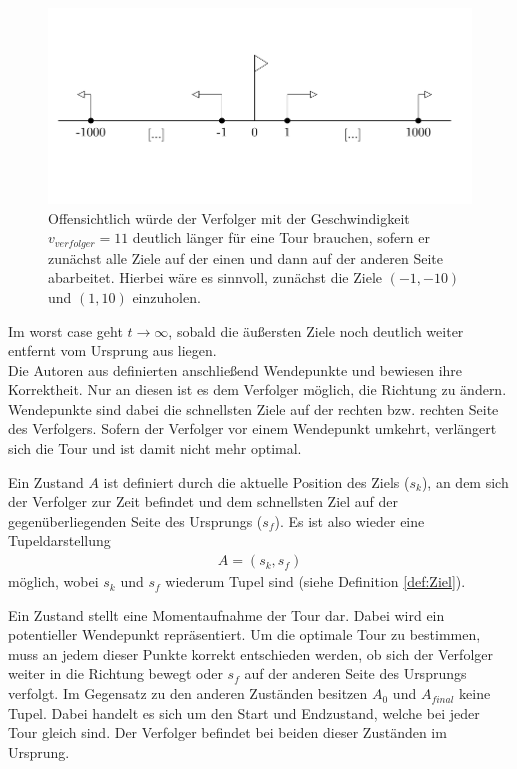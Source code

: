 \documentclass[german,version-2019-11]{uzl-thesis}
\begin{document}
\begin{figure}[htbp]
\centering
\includegraphics[scale=0.68]{../Grafiken/Verwendete/1DGegenbsp.PNG}
\caption{Offensichtlich würde der Verfolger mit der Geschwindigkeit $v_{verfolger}=11$ deutlich länger für eine Tour brauchen, sofern er zunächst alle Ziele auf der einen und dann auf der anderen Seite abarbeitet. Hierbei wäre es sinnvoll, zunächst die Ziele $(-1,-10)$ und $(1,10)$ einzuholen.}
\label{fig:GegenBsp1Dim}
\end{figure}
Im worst case geht $t\rightarrow\infty$, sobald die äußersten Ziele noch deutlich weiter entfernt vom Ursprung aus liegen. \\
Die Autoren aus \cite{helvig} definierten anschließend Wendepunkte und bewiesen ihre Korrektheit. Nur an diesen ist es dem Verfolger möglich, die Richtung zu ändern. Wendepunkte sind dabei die schnellsten Ziele auf der rechten bzw. rechten Seite des Verfolgers. Sofern der Verfolger vor einem Wendepunkt umkehrt, verlängert sich die Tour und ist damit nicht mehr optimal.
\begin{definition}
Ein Zustand $A$ ist definiert durch die aktuelle Position des Ziels ($s_k$), an dem sich der Verfolger zur Zeit befindet und dem schnellsten Ziel auf der gegenüberliegenden Seite des Ursprungs ($s_f$). Es ist also wieder eine Tupeldarstellung
\begin{align*}
A = (s_k, s_f)
\end{align*}
möglich, wobei $s_k$ und $s_f$ wiederum Tupel sind (siehe Definition \ref{def:Ziel}).
\end{definition}\noindent
Ein Zustand stellt eine Momentaufnahme der Tour dar. Dabei wird ein potentieller Wendepunkt repräsentiert. Um die optimale Tour zu bestimmen, muss an jedem dieser Punkte korrekt entschieden werden, ob sich der Verfolger weiter in die Richtung bewegt oder $s_f$ auf der anderen Seite des Ursprungs verfolgt. Im Gegensatz zu den anderen Zuständen besitzen $A_0$ und $A_{final}$ keine Tupel. Dabei handelt es sich um den Start und Endzustand, welche bei jeder Tour gleich sind. Der Verfolger befindet bei beiden dieser Zuständen im Ursprung. 
\end{document}
